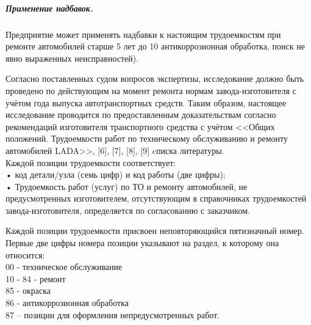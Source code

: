 \subparagraph{Применение надбавок.}  Предприятие может применять надбавки к настоящим трудоемкостям при ремонте автомобилей старше
5 лет до 10%
антикоррозионная обработка, поиск не явно выраженных неисправностей).







Согласно поставленных судом вопросов экспертизы, исследование должно быть проведено по действующим на момент ремонта  нормам завода-изготовителя с учётом года выпуска автотранспортных средств. Таким образом, настоящее исследование проводится по предоставленным доказательствам   согласно рекомендаций изготовителя транспортного средства с учётом <<Общих положений. Трудоемкости работ по техническому обслуживанию и ремонту автомобилей LADA>>, [6], [7], [8], [9] cписка литературы.\\
 Каждой позиции трудоемкости соответствует:\\
	• код детали/узла (семь цифр) и код работы (две цифры);\\
    • Трудоемкость работ (услуг) по ТО и ремонту автомобилей, не предусмотренных изготовителем, отсутствующим в справочниках трудоемкостей завода-изготовителя, определяется по согласованию с заказчиком.
    
    Каждой позиции трудоемкости присвоен неповторяющийся пятизначный номер. Первые
    две цифры номера позиции указывают на раздел, к которому она относится:\\
    00 - техническое обслуживание\\
    10 - 84 - ремонт\\
    85 - окраска\\
    86 - антикоррозионная обработка\\
    87 – позиции для оформления непредусмотренных работ.\\
    

